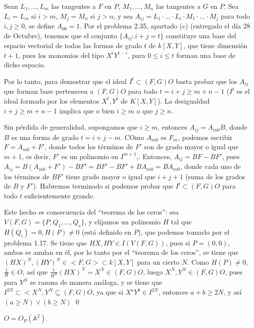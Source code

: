 \begin{Dem}
  Sean $L_1,\dots ,L_m$ las tangentes a $F$ en $P$, $M_1,\dots, M_n$ las tangentes a $G$ en $P$. Sea $L_i=L_m$ si $i>m$, $M_j=M_n$ si $j>n$, y sea $A_{ij}=L_1\cdot \dots \cdot L_i \cdot M_1 \cdot \dots \cdot M_j$ para todo $i,j\ge 0$, se define $A_{00}=1$. Por el problema 2.35, apartado (c) (entregado el día 28 de Octubre), tenemos que el conjunto $\{A_{ij} : i+j = t\}$ constituye una base del espacio vectorial de todas las formas de grado $t$ de $k[X,Y]$, que tiene dimensión $t+1$, pues los monomios del tipo $X^iY^{t-i}$, para $0\le i \le t$ forman una base de dicho espacio.

  Por lo tanto, para demostrar que el ideal $I^t\subset (F,G)O$ basta probar que los $A_{ij}$ que forman base pertenecen a $(F,G)O$ para todo $t=i+j\ge m+n-1$ ($I^t$ es el ideal formado por los elementos $X^t, Y^t$ de $K[X,Y]$). La desigualdad $i+j \ge m+n-1$ implica que o bien $i\ge m$ o que $j \ge n$.

  Sin pérdida de generalidad, supongamos que $i\ge m$, entonces $A_{ij}=A_{m0}B$, donde $B$ es una forma de grado $t=i+j-m$.  COmo $A_{m0}$ es $F_m$, podemos escribir $F=A_{m0}+F'$, donde todos los términos de $F'$ son de grado mayor o igual que $m+1$, es decir, $F'$ es un polinomio en $I^{m+1}$,. Entonces, $A_{ij}=BF-BF'$, pues $A_{ij}=B(A_{m0}+F')-BF'=BF'-BF'+BA_{m0}=BA_{m0}$, donde cada uno de los términos de $BF'$ tiene grado mayor o igual que $i+j+1$ (suma de los grados de $B$ y $F'$). Habremos terminado si podemos probar que $I^t\subset (F,G)O$ para todo $t$ suficientemente grande.

  Este hecho es consecuencia del ``teorema de los ceros'': sea $V(F,G)=\{P,Q_1,\dots , Q_s\}$, y elijamos un polinomio $H$ tal que $H(Q_i)=0, H(P)\neq 0$ (está definido en $P$), que podemos tomarlo por el problema 1.17. Se tiene que $HX,HY\in I(V(F,G))$, pues si $P=(0,0)$, ambos se anulan en él, por lo tanto por el ``teorema de los ceros'', se tiene que $(HX)^N,(HY)^N \in <F,G>\subset k[X,Y]$ para un cierto $N$. Como $H(P)\neq 0$, $\frac{1}{H}\in O$, así que $\frac{1}{H^N}(HX)^N= X^N \in (F,G)O$,  luego $X^N,Y^N\in (F,G)O$, pues para $Y^N$ se razona de manera análoga, y se tiene que $I^{2N}\subset <X^N,Y^N \subseteq (F,G)O$, ya que si $X^aY^b \in I^{2N}$, entonces $a+b\ge 2N$, y así $(a\ge N)\vee (b\ge N)$  \qed
\end{Dem}

\begin{nota}
$O=O_P(\mathbb{A}^2)$. 
\end{nota}

